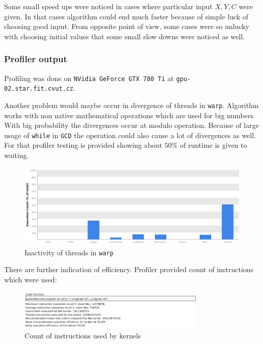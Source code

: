 \documentclass[a4paper]{article}
\begin{document}
Some small speed ups were noticed in cases where particular input $X, Y, C$ were given. In that cases algorithm could end much faster because of simple luck of choosing good input. From opposite point of view, some cases were so unlucky with choosing initial values that some small slow downs were noticed as well.

\subsubsection{Profiler output}

Profiling was done on \texttt{NVidia GeForce GTX 780 Ti} at \texttt{gpu-02.star.fit.cvut.cz}.

Another problem would maybe occur in divergence of threads in \texttt{warp}. Algorithm works with non native mathematical operations which are used for big numbers. With big probability the divergences occur at modulo operation. Because of large usage of \texttt{while} in \texttt{GCD} the operation could also cause a lot of divergences as well. For that profiler testing is provided showing about $50\%$ of runtime is given to waiting.

\begin{figure}[H]
  \centering
    \includegraphics[width=1\textwidth]{inactive.png}
  \caption{Inactivity of threads in \texttt{warp}}
  \label{inactive}
\end{figure}


There are further indication of efficiency. Profiler provided count of instructions which were used:

\begin{figure}[H]
  \centering
    \includegraphics[width=0.8\textwidth]{insv1.png}
  \caption{Count of instructions used by kernels}
  \label{inactive}
\end{figure}
\end{document}
